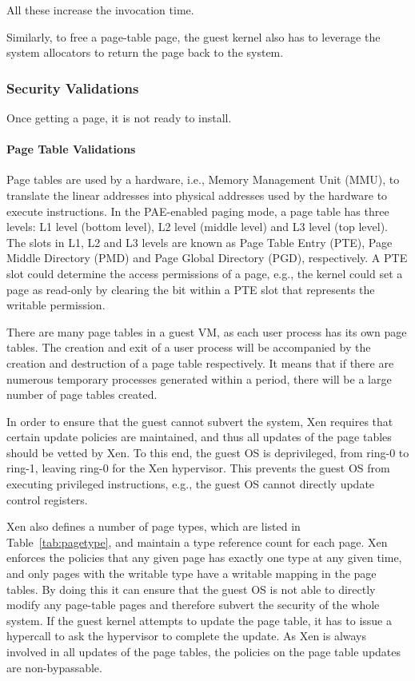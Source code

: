 All these increase the invocation time.

Similarly, to free a page-table page, the guest kernel also has to leverage the system allocators to return the page back to the system.


\subsubsection{Security Validations}
Once getting a page, it is not ready to install.

\paragraph{Page Table Validations}\label{sec:pv-security}

Page tables are used by a hardware, i.e., Memory Management Unit (MMU), to translate the linear addresses into physical addresses used by the hardware to execute instructions.
In the PAE-enabled paging mode, a page table has three levels: L1 level (bottom level), L2 level (middle level) and L3 level (top level).
The slots in L1, L2 and L3 levels are known as Page Table Entry (PTE), Page Middle Directory (PMD) and Page Global Directory (PGD), respectively.
A PTE slot could determine the access permissions of a page, e.g., the kernel could set a page as read-only by clearing the bit within a PTE slot that represents the writable permission.

There are many page tables in a guest VM, as each user process has its own page tables.
The creation and exit of a user process will be accompanied by the creation and destruction of a page table respectively.
It means that if there are numerous temporary processes generated within a period, there will be a large number of page tables created.

In order to ensure that the guest cannot subvert the system, Xen requires that certain update policies are maintained,
and thus all updates of the page tables should be vetted by Xen.
To this end, the guest OS is deprivileged, from ring-0 to ring-1, leaving ring-0 for the Xen hypervisor.
This prevents the guest OS from executing privileged instructions, e.g., the guest OS cannot directly update control registers.

Xen also defines a number of page types, which are listed in Table~\ref{tab:pagetype}, and maintain a type reference count for each page.
Xen enforces the policies that any given page has exactly one type at any given time,
and only pages with the writable type have a writable mapping in the page tables.
By doing this it can ensure that the guest OS is not able to directly modify any page-table pages and therefore subvert the security of the whole system.
If the guest kernel attempts to update the page table, it has to issue a hypercall to ask the hypervisor to complete the update.
As Xen is always involved in all updates of the page tables, the policies on the page table updates are non-bypassable.

